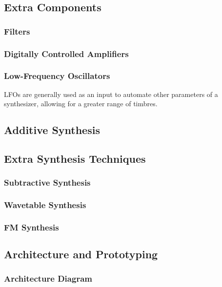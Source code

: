 \documentclass[12pt]{article}
\begin{document}
\subsection{Extra Components}
\subsubsection*{Filters}


\subsubsection*{Digitally Controlled Amplifiers}


\subsubsection*{Low-Frequency Oscillators}
LFOs are generally used as an input to automate other parameters of a synthesizer, allowing for a greater range of timbres.

\subsection{Additive Synthesis}


\subsection{Extra Synthesis Techniques}

\subsubsection*{Subtractive Synthesis}

\subsubsection*{Wavetable Synthesis}

\subsubsection*{FM Synthesis}

\subsection{Architecture and Prototyping}

\subsubsection{Architecture Diagram}
\end{document}
